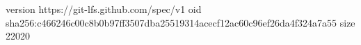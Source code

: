 version https://git-lfs.github.com/spec/v1
oid sha256:c466246c00c8b0b97ff3507dba25519314acecf12ac60c96ef26da4f324a7a55
size 22020
